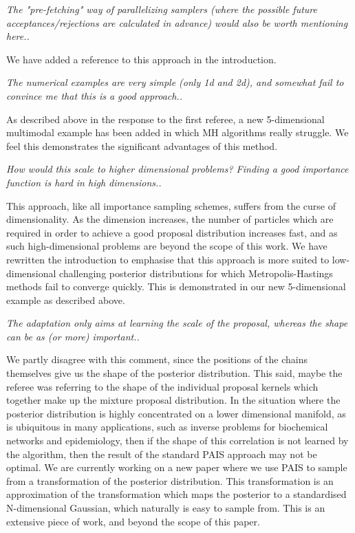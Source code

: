 \documentclass{article}
\newcommand{\comment}[2]{\vspace{0.6cm}{\bf Comment:} {\it #1.}

\vspace{0.3cm}{\bf Answer:} #2}
\begin{document}
\comment{The "pre-fetching" way of parallelizing samplers (where the possible future acceptances/rejections are calculated in advance) would also be worth mentioning here.}{We have added a reference to this approach in the introduction.}

\comment{The numerical examples are very simple (only 1d and 2d), and somewhat fail to convince me that this is a good approach.}{As described above in the response to the first referee, a new 5-dimensional multimodal example has been added in which MH algorithms really struggle. We feel this demonstrates the significant advantages of this method.}

\comment{How would this scale to higher dimensional problems? Finding a good importance function is hard in high dimensions.}{This approach, like all importance sampling schemes, suffers from the curse of dimensionality. As the dimension increases, the number of particles which are required in order to achieve a good proposal distribution increases fast, and as such high-dimensional problems are beyond the scope of this work. We have rewritten the introduction to emphasise that this approach is more suited to low-dimensional challenging posterior distributions for which Metropolis-Hastings methods fail to converge quickly. This is demonstrated in our new 5-dimensional example as described above.}

\comment{The adaptation only aims at learning the scale of the proposal, whereas the shape can be as (or more) important.}{We partly disagree with this comment, since the positions of the chains themselves give us the shape of the posterior distribution. This said, maybe the referee was referring to the shape of the individual proposal kernels which together make up the mixture proposal distribution. In the situation where the posterior distribution is highly concentrated on a lower dimensional manifold, as is ubiquitous in many applications, such as inverse problems for biochemical networks and epidemiology, then if the shape of this correlation is not learned by the algorithm, then the result of the standard PAIS approach may not be optimal. We are currently working on a new paper where we use PAIS to sample from a transformation of the posterior distribution. This transformation is an approximation of the transformation which maps the posterior to a standardised N-dimensional Gaussian, which naturally is easy to sample from. This is an extensive piece of work, and beyond the scope of this paper.}
\end{document}
